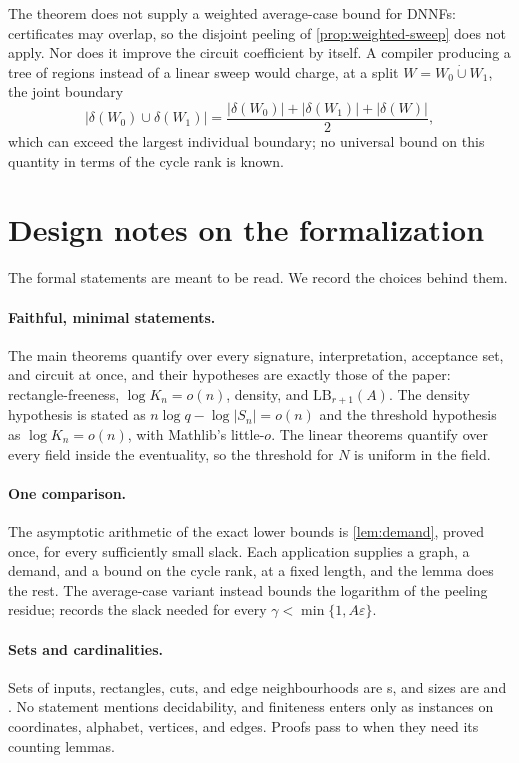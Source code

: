\documentclass[11pt]{article}
\theoremstyle{plain}
\theoremstyle{definition}
\theoremstyle{remark}
\newcommand{\LB}{\mathrm{LB}}
\newcommand{\card}[1]{\lvert #1\rvert}
\begin{document}
The theorem does not supply a weighted average-case bound for DNNFs: certificates may
overlap, so the disjoint peeling of \cref{prop:weighted-sweep} does not apply. Nor does it
improve the circuit coefficient by itself. A compiler producing a tree of regions instead
of a linear sweep would charge, at a split $W=W_0\mathbin{\dot\cup}W_1$, the joint boundary
\[
  \card{\delta(W_0)\cup\delta(W_1)}=
  \frac{\card{\delta(W_0)}+\card{\delta(W_1)}+\card{\delta(W)}}2,
\]
which can exceed the largest individual boundary; no universal bound on this quantity
in terms of the cycle rank is known.

\section{Design notes on the formalization}
\label{sec:design}

The formal statements are meant to be read. We record the choices behind them.

\paragraph{Faithful, minimal statements.}
The main theorems quantify over every signature, interpretation, acceptance set, and circuit
at once, and their hypotheses are exactly those of the paper: rectangle-freeness,
$\log K_n = o(n)$, density, and $\LB_{r+1}(A)$. The density hypothesis is stated as
$n \log q - \log\card{S_n} = o(n)$ and the threshold hypothesis as $\log K_n = o(n)$, with
Mathlib's little-$o$. The linear theorems quantify over every field inside the eventuality, so
the threshold for $N$ is uniform in the field.

\paragraph{One comparison.}
The asymptotic arithmetic of the exact lower bounds is \cref{lem:demand}, proved once, for every
sufficiently small slack. Each application supplies a graph, a demand, and a bound on the cycle
rank, at a fixed length, and the lemma does the rest. The average-case variant instead bounds
the logarithm of the peeling residue;  records the slack
needed for every $\gamma<\min\{1,A\varepsilon\}$.

\paragraph{Sets and cardinalities.}
Sets of inputs, rectangles, cuts, and edge neighbourhoods are s, and sizes are
 and . No statement mentions decidability, and finiteness enters
only as  instances on coordinates, alphabet, vertices, and edges. Proofs pass to
 when they need its counting lemmas.
\end{document}
